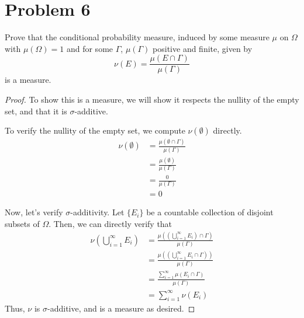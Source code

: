 \documentclass[fontsize=11pt]{scrartcl} %
\numberwithin{equation}{section} %
\numberwithin{figure}{section} %
\numberwithin{table}{section} %
\begin{document}
\section*{Problem 6}
Prove that the conditional probability measure, induced by some measure $\mu$ on $\Omega$
with $\mu(\Omega) = 1$ and for some $\Gamma$, $\mu(\Gamma)$ positive and finite, given by
\[
\nu(E) = \frac{\mu(E\cap\Gamma)}{\mu(\Gamma)}
\]
is a measure.
\\
\begin{proof}
To show this is a measure, we will show it respects the nullity of the empty set, and that
it is $\sigma$-additive.

To verify the nullity of the empty set, we compute $\nu(\emptyset)$ directly.
\[
\begin{aligned}
\nu(\emptyset)  &= \frac{\mu(\emptyset\cap\Gamma)}{\mu(\Gamma)}\\
                &= \frac{\mu(\emptyset)}{\mu(\Gamma)}\\
                &= \frac{0}{\mu(\Gamma)}\\
                &= 0
\end{aligned}
\]

Now, let's verify $\sigma$-additivity. Let $\{E_i\}$ be a countable collection
of disjoint subsets of $\Omega$. Then, we can directly verify that
\[
\begin{aligned}
\nu\left(\bigcup_{i=1}^{\infty} E_i\right)  &= \frac{\mu\left(\left(\bigcup_{i=1}^{\infty} E_i\right)\cap\Gamma\right)}{\mu(\Gamma)}\\
            &=\frac{\mu\left(\left(\bigcup_{i=1}^{\infty} E_i\cap\Gamma\right)\right)}{\mu(\Gamma)}\\
            &=\frac{\sum_{i=1}^{\infty} \mu(E_i\cap\Gamma)}{\mu(\Gamma)}\\
            &=\sum_{i=1}^{\infty}\nu(E_i)
\end{aligned}
\]
Thus, $\nu$ is $\sigma$-additive, and is a measure as desired.
\end{proof}

\end{document}
